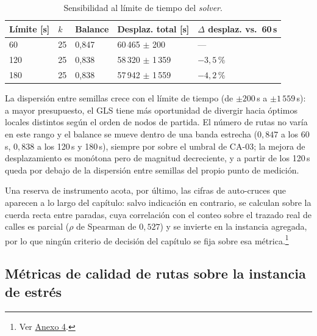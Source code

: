 \begin{enumerate}
\begin{table}[H]
  \centering
  \caption{Sensibilidad al límite de tiempo del \textit{solver}.}
  \label{tab:sensibilidad-tl}
  \begin{tabularx}{\textwidth}{XlXXX}
    \toprule
    Límite [s] &
      $k$ &
      Balance &
      Desplaz. total [s] &
      $\Delta$ desplaz. vs.\ 60\,s \\
    \midrule
    60  &
      25 &
      0{,}847 &
      60\,465 $\pm$ 200  &
      --- \\
    120 &
      25 &
      0{,}838 &
      58\,320 $\pm$ 1\,359 &
      $-3{,}5$\,\% \\
    180 &
      25 &
      0{,}838 &
      57\,942 $\pm$ 1\,559 &
      $-4{,}2$\,\% \\
    \bottomrule
  \end{tabularx}
\end{table}

La dispersión entre semillas crece con el límite de tiempo (de $\pm 200$\,s a $\pm 1\,559$\,s): a
mayor presupuesto, el GLS tiene más oportunidad de divergir hacia óptimos locales distintos según el
orden de nodos de partida. El número de rutas no varía en este rango y el balance se mueve dentro de
una banda estrecha ($0{,}847$ a los 60\,s, $0{,}838$ a los 120\,s y 180\,s), siempre por sobre el
umbral de CA-03; la mejora de desplazamiento es monótona pero de magnitud decreciente, y a partir de
los 120\,s queda por debajo de la dispersión entre semillas del propio punto de medición.

Una reserva de instrumento acota, por último, las cifras de auto-cruces que aparecen a lo largo del
capítulo: salvo indicación en contrario, se calculan sobre la cuerda recta entre paradas, cuya
correlación con el conteo sobre el trazado real de calles es parcial ($\rho$ de Spearman de
$0{,}527$) y se invierte en la instancia agregada, por lo que ningún criterio de decisión del
capítulo se fija sobre esa métrica.\footnote{Ver \hyperref[anx:auditoria-robustez]{Anexo 4}.}

\end{enumerate}

\subsection{Métricas de calidad de rutas sobre la instancia de estrés}
\label{sec:metricas-calidad}

